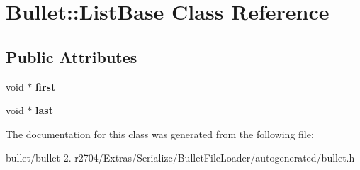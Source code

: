 \hypertarget{class_bullet_1_1_list_base}{\section{Bullet\+:\+:List\+Base Class Reference}
\label{class_bullet_1_1_list_base}
}
\subsection*{Public Attributes}
\begin{DoxyCompactItemize}
\item 
\hypertarget{class_bullet_1_1_list_base_a6ac096a9f3a42c33fb7c314246533d29}{void $\ast$ {\bfseries first}}\label{class_bullet_1_1_list_base_a6ac096a9f3a42c33fb7c314246533d29}

\item 
\hypertarget{class_bullet_1_1_list_base_a41d24a06df70092fba98154708db9c2b}{void $\ast$ {\bfseries last}}\label{class_bullet_1_1_list_base_a41d24a06df70092fba98154708db9c2b}

\end{DoxyCompactItemize}


The documentation for this class was generated from the following file\+:\begin{DoxyCompactItemize}
\item 
bullet/bullet-\/2.-\/r2704/\+Extras/\+Serialize/\+Bullet\+File\+Loader/autogenerated/bullet.\+h\end{DoxyCompactItemize}
